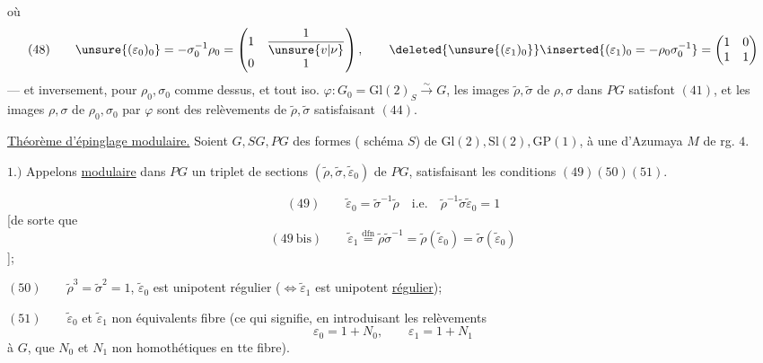 

où 
\[
(48)\qquad
\unsure{(\varepsilon_0)_0}=-\sigma_0^{-1}\rho_0=
\begin{pmatrix}1&\dfrac{1}{\unsure{v|\nu}}\\0&1\end{pmatrix},\qquad
\deleted{\unsure{(\varepsilon_1)_0}}
\inserted{(\varepsilon_1)_0=-\rho_0\sigma_0^{-1}}=
\begin{pmatrix}1&0\\1&1\end{pmatrix}
\]
--- et inversement, pour $\rho_0,\sigma_0$ comme dessus, et tout iso.
$\varphi:G_0=\mathrm{Gl}(2)_S\xrightarrow{\sim}G$, les images
$\widetilde\rho,\widetilde\sigma$ de $\rho,\sigma$ dans $PG$ satisfont
$(41)$, et les images $\rho,\sigma$ de $\rho_0,\sigma_0$ par $\varphi$
sont des relèvements de $\widetilde\rho,\widetilde\sigma$ satisfaisant $(44)$.

\uline{Théorème d'épinglage modulaire.} Soient $G,SG,PG$ des formes
( schéma $S$) de $\mathrm{Gl}(2),\mathrm{Sl}(2),\mathrm{GP}(1)$,
 à une  d'Azumaya $M$ de rg. $4$.

$1.)$ Appelons \uline{ modulaire}
dans $PG$ un triplet de sections $(\widetilde\rho,\widetilde\sigma,
\widetilde\varepsilon_0)$ de $PG$, satisfaisant les conditions $(49)(50)(51)$.


\[
(49)\qquad \widetilde\varepsilon_0=\widetilde\sigma^{-1}\widetilde\rho
\quad\text{i.e.}\quad
\widetilde\rho^{-1}\widetilde\sigma\widetilde\varepsilon_0=1
\]
[de sorte que
\[
(49\ \mathrm{bis})\qquad
\widetilde\varepsilon_1\overset{\mathrm{dfn}}=
\widetilde\rho\widetilde\sigma^{-1}=
\widetilde\rho(\widetilde\varepsilon_0)=
\widetilde\sigma(\widetilde\varepsilon_0)
\]
];

$(50)\qquad \widetilde\rho^3=\widetilde\sigma^2=1$,\quad
$\widetilde\varepsilon_0$ est unipotent régulier
($\Longleftrightarrow\widetilde\varepsilon_1$ est unipotent \uline{régulier});

$(51)\qquad \widetilde\varepsilon_0$ et $\widetilde\varepsilon_1$
 non équivalents 
 fibre
(ce qui signifie, en introduisant les relèvements
\[
\varepsilon_0=1+N_0,\qquad \varepsilon_1=1+N_1
\]
à $G$, que $N_0$ et $N_1$ non homothétiques en tte fibre).

